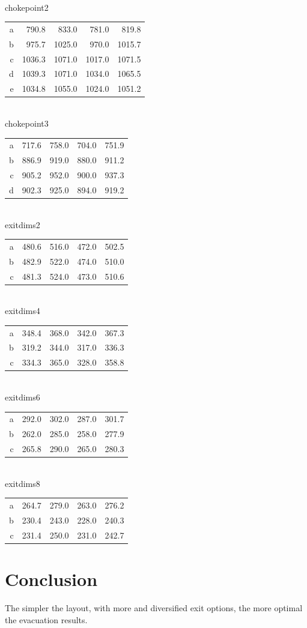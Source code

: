 \documentclass[12pt,letterpaper]{article}
\begin{document}
\\
chokepoint2
\begin{tabular}{ r | r | r | r | r }
a &  790.8 &  833.0 &  781.0 &  819.8 \\
b &  975.7 & 1025.0 &  970.0 & 1015.7 \\
c & 1036.3 & 1071.0 & 1017.0 & 1071.5 \\
d & 1039.3 & 1071.0 & 1034.0 & 1065.5 \\
e & 1034.8 & 1055.0 & 1024.0 & 1051.2 \\
\end{tabular}

\\
chokepoint3
\begin{tabular}{ r | r | r | r | r }
a &  717.6 & 758.0 & 704.0 & 751.9 \\
b &  886.9 & 919.0 & 880.0 & 911.2 \\
c &  905.2 & 952.0 & 900.0 & 937.3 \\
d &  902.3 & 925.0 & 894.0 & 919.2 \\
\end{tabular}            

\\
exitdims2
\begin{tabular}{ r | r | r | r | r }
a & 480.6 & 516.0 & 472.0 & 502.5 \\
b & 482.9 & 522.0 & 474.0 & 510.0 \\
c & 481.3 & 524.0 & 473.0 & 510.6 \\
\end{tabular}
                          
\\
exitdims4
\begin{tabular}{ r | r | r | r | r }
a & 348.4 & 368.0 & 342.0 & 367.3 \\
b & 319.2 & 344.0 & 317.0 & 336.3 \\
c & 334.3 & 365.0 & 328.0 & 358.8 \\
\end{tabular}

\\
exitdims6
\begin{tabular}{ r | r | r | r | r }
a & 292.0 & 302.0 & 287.0 & 301.7 \\
b & 262.0 & 285.0 & 258.0 & 277.9 \\
c & 265.8 & 290.0 & 265.0 & 280.3 \\
\end{tabular}

\\
exitdims8
\begin{tabular}{ r | r | r | r | r }
a& 264.7& 279.0& 263.0& 276.2 \\
b& 230.4& 243.0& 228.0& 240.3 \\
c& 231.4& 250.0& 231.0& 242.7 \\
\end{tabular}
\section {Conclusion}

The simpler the layout, with more and diversified exit options, the more optimal
the evacuation results.




\end{document}
